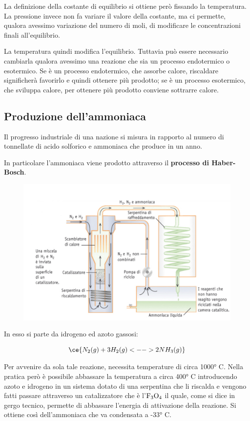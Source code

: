 \vspace{0.2cm}\normalsize La definizione della costante di equilibrio si ottiene però fissando la temperatura. La pressione invece non fa variare il valore della costante, ma ci permette, qualora avessimo variazione del numero di moli, di modificare le concentrazioni finali all'equilibrio.

La temperatura quindi modifica l'equilibrio. Tuttavia può essere necessario cambiarla qualora avessimo una reazione che sia un processo endotermico o esotermico. Se è un processo endotermico, che assorbe calore, riscaldare significherà favorirlo e quindi ottenere più prodotto; se è un processo esotermico, che sviluppa calore, per ottenere più prodotto conviene sottrarre calore.
\subsection{Produzione dell'ammoniaca}
Il progresso industriale di una nazione si misura in rapporto al numero di tonnellate di acido solforico e ammoniaca che produce in un anno.

In particolare l'ammoniaca viene prodotto attraverso il \textbf{processo di Haber-Bosch}.

\vspace{-1cm}\begin{figure}[htp]
    \centering
    \includegraphics[width=14cm]{immagini/produzione_ammoniaca.png}
\end{figure}

In esso si parte da idrogeno ed azoto gassosi:

$$\ce{N_2(g) + 3H_2(g) <--> 2NH_3(g)}$$

Per avvenire da sola tale reazione, necessita temperature di circa 1000° C. Nella pratica però è possibile abbassare la temperatura a circa 400° C introducendo azoto e idrogeno in un sistema dotato di una serpentina che li riscalda e vengono fatti passare attraverso un catalizzatore che è l'$\rm F_3O_4$ il quale, come si dice in gergo tecnico, permette di abbassare l'energia di attivazione della reazione. Si ottiene così dell'ammoniaca che va condensata a -33° C.

